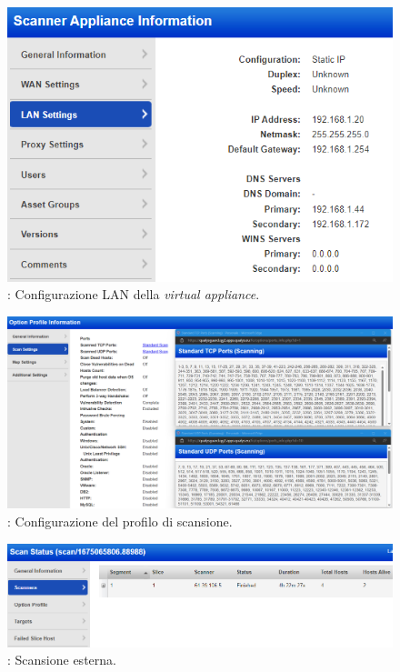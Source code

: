\documentclass[target=bach,aauheader=]{thud}
\begin{document}
\begin{figure}[t]
\centering
    \includegraphics[scale=0.7]{images/qualys_appliance2.png}
    \caption{: Configurazione LAN della \textit{virtual appliance}.}
    \label{fig:qualys_appliance}
\end{figure}

\begin{figure}[t]
\centering
    \includegraphics[scale=0.35]{images/qualys_scan-profile.png}
    \caption{: Configurazione del profilo di scansione.}
    \label{fig:qualys_scan-profile}
\end{figure}

\begin{figure}[t]
\centering
    \includegraphics[scale=0.6]{images/qualys_scan_ext.png}
    \caption{: Scansione esterna.}
    \label{fig:qualys_scan_ext}
\end{figure}
\end{document}
